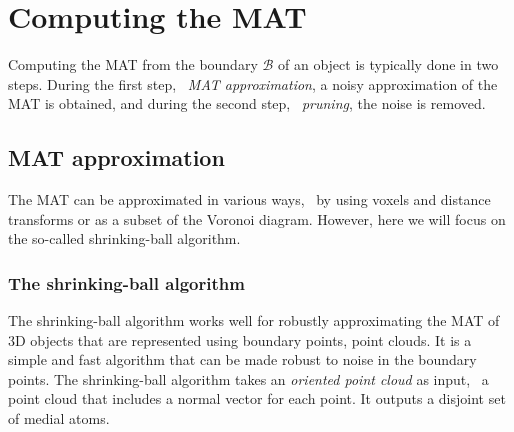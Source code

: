
\section{Computing the MAT} 
Computing the MAT from the boundary $\mathcal{B}$ of an object is typically done in two steps. 
During the first step, \ie\ \emph{MAT approximation}, a noisy approximation of the MAT is obtained, and during the second step, \ie\ \emph{pruning}, the noise is removed.

\subsection{MAT approximation}
The MAT can be approximated in various ways, \eg~by using voxels and distance transforms or as a subset of the Voronoi diagram.
However, here we will focus on the so-called shrinking-ball algorithm.

\subsubsection{The shrinking-ball algorithm}
The shrinking-ball algorithm works well for robustly approximating the MAT of 3D objects that are represented using boundary points, \ie point clouds.
It is a simple and fast algorithm that can be made robust to noise in the boundary points.
The shrinking-ball algorithm takes an \emph{oriented point cloud} as input, \ie\ a point cloud that includes a normal vector for each point. 
It outputs a disjoint set of medial atoms. 

